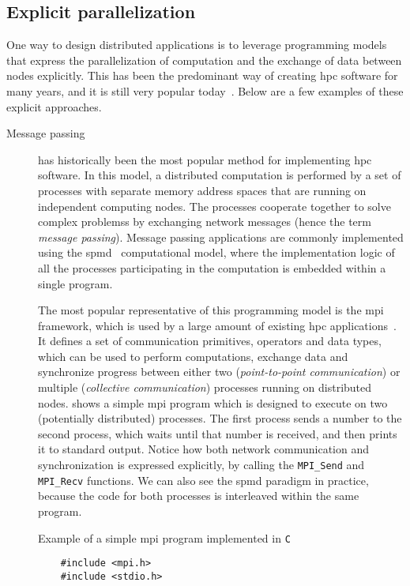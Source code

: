 \subsection*{Explicit parallelization}
One way to design distributed applications is to leverage programming models that express the
parallelization of computation and the exchange of data between nodes explicitly. This has been the
predominant way of creating \gls{hpc} software for many years, and it is still very
popular today~\cite{mpiusagestudy1,mpiusagestudy2,mpiusagestudy3}. Below are a few examples of these explicit approaches.

\begin{description}
	\item[Message passing] has historically been the most popular method for implementing \gls{hpc} software. In
		this model, a distributed computation is performed by a set of processes with separate memory
		address spaces that are running on independent computing nodes. The processes cooperate together to
		solve complex problemss by exchanging network messages (hence the term \emph{message passing}).
		Message passing applications are commonly implemented using the
		\gls{spmd}~\cite{spmd} computational model, where the implementation logic
		of all the processes participating in the computation is embedded within a single program.

		The most popular representative of this programming model is the
		\gls{mpi}~\cite{mpi} framework, which is used by a large amount of
		existing \gls{hpc} applications~\cite{mpiusagestudy2}. It defines a set of
		communication primitives, operators and data types, which can be used to perform computations,
		exchange data and synchronize progress between either two (\emph{point-to-point communication}) or multiple
		(\emph{collective communication}) processes running on distributed nodes.  shows a
		simple \gls{mpi} program which is designed to execute on two (potentially distributed)
		processes. The first process sends a number to the second process, which waits until that number is
		received, and then prints it to standard output. Notice how both network communication and
		synchronization is expressed explicitly, by calling the \texttt{MPI\_Send} and
		\texttt{MPI\_Recv} functions. We can also see the \gls{spmd} paradigm in practice,
		because the code for both processes is interleaved within the same program.

		\begin{listing}[h]
			\caption{Example of a simple \gls{mpi} program implemented in \texttt{C}}
			\label{lst:mpi-example}
			\begin{verbatim}
	#include <mpi.h>
	#include <stdio.h>


\end{verbatim}
\end{listing}
\end{description}
